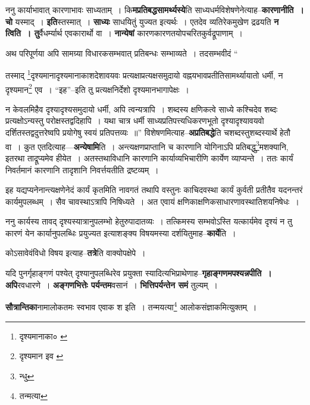 \documentclass[article,12pt,a4paper]{memoir}
\begin{document}
	  \pstart ननु कार्याभावात् कारणाभावः साध्यताम् । कि\textbf{मप्रतिबद्धसामर्थ्यस्ये}ति साध्यधर्मविशेषणेनेत्याह--\textbf{कारणानीति । चो} यस्माद् । \textbf{इति}स्तस्मात् । \textbf{साध्यः} साधयितुं युज्यत इत्यर्थः । एतदेव व्यतिरेकमुखेण द्रढयति \textbf{न त्विति । तु}र्वैधर्म्यार्थ एवकारार्थो वा । \textbf{नान्येषां} कारणकारणतयोपचरितकुर्वद्रूपाणाम् ।
	\pend
      

	  \pstart अथ परिपूर्णया अपि सामग्र्या विधारकसम्भवात् प्रतिबन्धः सम्भाव्यते । तदसम्भवीदं  \leavevmode{} “
	  
	तस्माद् \footnote{दृश्यमानाका० \cite{dp-msC} \cite{dp-msA}}दृश्यमानादृश्यमानाकाशदेशावयवः प्रत्यक्षाप्रत्यक्षसमुदायो वह्नयभावप्रतीतिसामर्थ्यायातो धर्मी, न दृश्यमान\footnote{दृश्यमान इव \cite{dp-msC}} एव । “इह”--इति तु प्रत्यक्षनिर्देशो दृश्यमानभागापेक्षः । 
	  
	न केवलमिहैव दृश्यादृश्यसमुदायो धर्मी, अपि त्वन्यत्रापि । शब्दस्य क्षणिकत्वे साध्ये कश्चिदेव शब्दः प्रत्यक्षोऽन्यस्तु परोक्षस्तद्वदिहापि । यथा चात्र धर्मी साध्यप्रतिपत्त्यधिकरणभूतो दृश्यादृश्यावयवो दर्शितस्तद्वदुत्तरेष्वपि प्रयोगेषु स्वयं प्रतिपत्तव्यः ॥” विशेषणमित्याह--\textbf{अप्रतिबद्धे}ति चशब्दस्तुशब्दस्यार्थे हेतौ वा । कुत एतदित्याह—\textbf{अन्येषामि}ति । अन्त्यक्षणप्राप्तानि च कारणानि योगिनाऽपि प्रतिबद्धु\footnote{न्धु}मशक्यानि, इतरथा ताद्रूप्यमेव हीयेत । अतस्तथाविधानि कारणानि कार्याव्यभिचारीणि कार्येण व्याप्यन्ते । ततः कार्यं निवर्तमानं कारणानि तादृशानि निवर्त्तयतीति द्रष्टव्यम् ।
	\pend
      

	  \pstart इह यद्यप्यनेनान्त्यक्षणेनेदं कार्यं कृतमिति नावगतं तथापि वस्तुनः काचिदवस्था कार्यं कुर्वती प्रतीतैव यदनन्तरं कार्यमुपलब्धम् । सैव चावस्थाऽत्रापि निषिध्यते । अत एवायं क्षणिकाक्षणिकसाधारणावस्थातिशयनिषेधः ।
	\pend
      

	  \pstart ननु कार्यस्य ता\leavevmode{}वद् दृश्यस्यात्रानुपलम्भो हेतुरुपादातव्यः । तत्किमस्य सम्भवोऽस्ति यत्कार्यमेव दृश्यं न तु कारणं येन कार्यानुपलब्धिः प्रयुज्यत इत्याशङ्क्य विषयमस्या दर्शयितुमाह--\textbf{कार्ये}ति ।
	\pend
      

	  \pstart कोऽसावेवंविधो विषय इत्याह--\textbf{तत्रे}ति वाक्योपक्षेपे ।
	\pend
      

	  \pstart यदि पुनर्गृहाङ्गणं पश्येत् दृश्यानुपलब्धिरेव प्रयुक्ता स्यादित्यभिप्राथेणाह--\textbf{गृहाङ्गणमपश्यन्नपीति । अपि}रवधारणे । \textbf{अङ्गणभित्तेः पर्यन्तम}वसानं । \textbf{भित्तिपर्यन्तेन समं} तुल्यम् ।
	\pend
      

	  \pstart \textbf{सौत्रान्तिका}नामालोकतमः स्वभाव एवाक श इति । तन्मयत्या\footnote{तन्मत्या} आलोकसंज्ञाकमित्युक्तम् ।
	\pend
      
\end{document}
